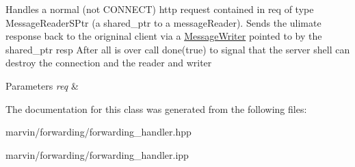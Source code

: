 Handles a normal (not C\+O\+N\+N\+E\+CT) http request contained in req of type Message\+Reader\+S\+Ptr (a shared\+\_\+ptr to a message\+Reader). Sends the ulimate response back to the origninal client via a \hyperlink{class_message_writer}{Message\+Writer} pointed to by the shared\+\_\+ptr resp After all is over call done(true) to signal that the server shell can destroy the connection and the reader and writer 
\begin{DoxyParams}{Parameters}
{\em req} & \\
\hline
\end{DoxyParams}


The documentation for this class was generated from the following files\+:\begin{DoxyCompactItemize}
\item 
marvin/forwarding/forwarding\+\_\+handler.\+hpp\item 
marvin/forwarding/forwarding\+\_\+handler.\+ipp\end{DoxyCompactItemize}
